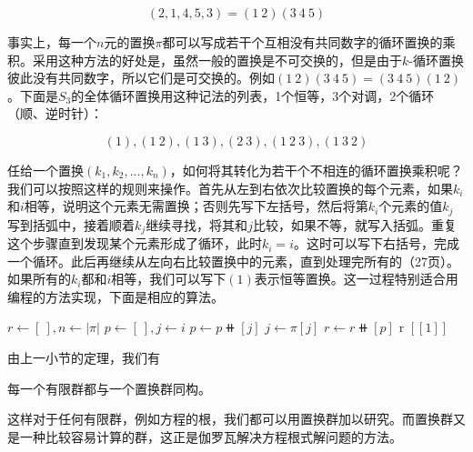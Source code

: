 \documentclass[b5paper]{ctexart}
\begin{document}
\[
(2, 1, 4, 5, 3) = (1\ 2)(3\ 4\ 5)
\]

事实上，每一个$n$元的置换$\pi$都可以写成若干个互相没有共同数字的循环置换的乘积。采用这种方法的好处是，虽然一般的置换是不可交换的，但是由于$k$-循环置换彼此没有共同数字，所以它们是可交换的。例如$(1\ 2)(3\ 4\ 5) = (3\ 4\ 5)(1\ 2)$。下面是$S_3$的全体循环置换用这种记法的列表，1个恒等，3个对调，2个循环（顺、逆时针）：

\[
(1), (1\ 2), (1\ 3), (2\ 3), (1\ 2\ 3), (1\ 3\ 2)
\]

任给一个置换$(k_1, k_2, ..., k_n)$，如何将其转化为若干个不相连的循环置换乘积呢？我们可以按照这样的规则来操作。首先从左到右依次比较置换的每个元素，如果$k_i$和$i$相等，说明这个元素无需置换；否则先写下左括号，然后将第$k_i$个元素的值$k_j$写到括弧中，接着顺着$k_j$继续寻找，将其和$j$比较，如果不等，就写入括弧。重复这个步骤直到发现某个元素形成了循环，此时$k_i = i$。这时可以写下右括号，完成一个循环。此后再继续从左向右比较置换中的元素，直到处理完所有的\cite{Armstrong1988}（27页）。如果所有的$k_i$都和$i$相等，我们可以写下$(1)$表示恒等置换。这一过程特别适合用编程的方法实现，下面是相应的算法。

\begin{algorithmic}[1]
  \State $r \gets [\ ], n \gets |\pi|$
    \State $p \gets [\ ], j \gets i$
      \State $p \gets p \doubleplus [j]$
      \State $j \gets \pi[j]$
    \EndWhile
      \State $r \gets r \doubleplus [p]$
    \EndIf
  \EndFor
    \State \Return r
  \Else
    \State \Return $[[1]]$ 
  \EndIf
\EndFunction
\end{algorithmic}

由上一小节的定理，我们有

\begin{theorem}
每一个有限群都与一个置换群同构。
\end{theorem}

这样对于任何有限群，例如方程的根，我们都可以用置换群加以研究。而置换群又是一种比较容易计算的群，这正是伽罗瓦解决方程根式解问题的方法。

\begin{Exercise}\label{ex:symmetric-group}
\end{Exercise}
\end{document}
